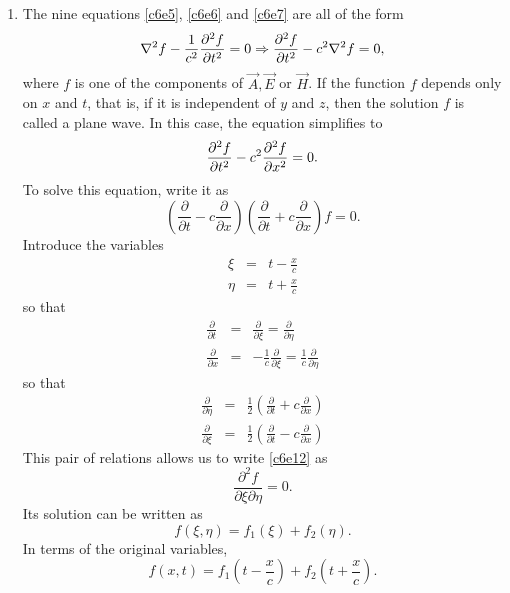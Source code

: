 \begin{enumerate}
\item The nine equations \eqref{c6e5}, \eqref{c6e6} and \eqref{c6e7} are all of
the form
\[
\nabla^2 f - \frac{1}{c^2}\frac{\partial^2{f}}{\partial{t}^2} = 0 \Rightarrow 
\frac{\partial^2{f}}{\partial{t}^2} - c^2\nabla^2 f = 0,
\]
where $f$ is one of the components of $\vec{A}, \vec{E}$ or $\vec{H}$. If the 
function $f$ depends only on $x$ and $t$, that is, if it is independent of $y$ 
and $z$, then the solution $f$ is called a plane wave. In this case, the 
equation simplifies to
\begin{equation}\label{c6e11}
\frac{\partial^2{f}}{\partial{t}^2} - c^2\frac{\partial^2{f}}{\partial{x}^2} = 0.
\end{equation}
To solve this equation, write it as
\begin{equation}\label{c6e12}
\left(\frac{\partial}{\partial t} - c\frac{\partial}{\partial x}\right)
\left(\frac{\partial}{\partial t} + c\frac{\partial}{\partial x}\right)f = 0.
\end{equation}
Introduce the variables
\begin{eqnarray}
\xi &=& t - \frac{x}{c} \label{c6e13} \\
\eta &=& t + \frac{x}{c} \label{c6e14}
\end{eqnarray}
so that
\begin{eqnarray}
\frac{\partial}{\partial t} &=& \frac{\partial}{\partial\xi} = 
 \frac{\partial}{\partial\eta} \label{c6e15} \\
\frac{\partial}{\partial x} &=& -\frac{1}{c}\frac{\partial}{\partial\xi} =
\frac{1}{c}\frac{\partial}{\partial\eta} \label{c6e16}
\end{eqnarray}
so that
\begin{eqnarray}
\frac{\partial}{\partial\eta} &=& \frac{1}{2}
	\left(\frac{\partial}{\partial t} + c\frac{\partial}{\partial x}\right) 
	\label{c6e17} \\
\frac{\partial}{\partial\xi} &=& \frac{1}{2}
	\left(\frac{\partial}{\partial t} - c\frac{\partial}{\partial x}\right) 
	\label{c6e18}
\end{eqnarray}
This pair of relations allows us to write \eqref{c6e12} as
\begin{equation}\label{c6e19}
\frac{\partial^2 f}{\partial\xi\partial\eta} = 0.
\end{equation}
Its solution can be written as
\begin{equation}\label{c6e20}
f(\xi, \eta) = f_1(\xi) + f_2(\eta).
\end{equation}
In terms of the original variables,
\begin{equation}\label{c6e21}
f(x, t) = f_1\left(t - \frac{x}{c}\right) + f_2\left(t + \frac{x}{c}\right).
\end{equation}


\end{enumerate}
